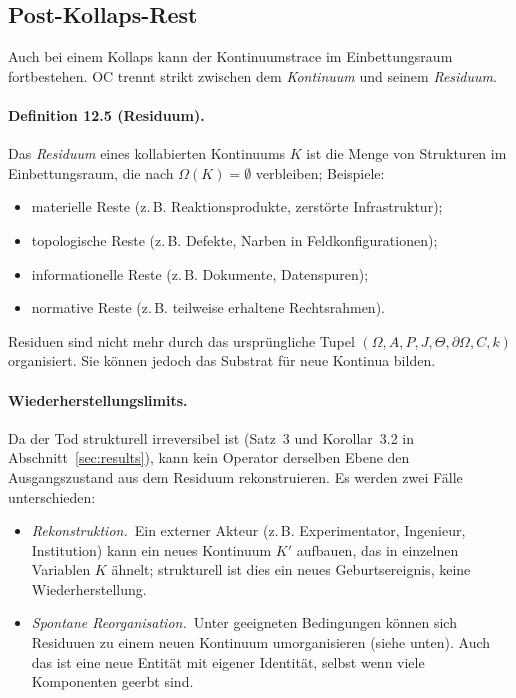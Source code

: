 \subsection{Post-Kollaps-Rest}

Auch bei einem Kollaps kann der Kontinuumstrace im Einbettungsraum fortbestehen.
OC trennt strikt zwischen dem \emph{Kontinuum} und seinem
\emph{Residuum}.

\paragraph{Definition 12.5 (Residuum).}
Das \emph{Residuum} eines kollabierten Kontinuums \(K\) ist die Menge von
Strukturen im Einbettungsraum, die nach \(\Omega(K)=\emptyset\) verbleiben; Beispiele:
\begin{itemize}
  \item materielle Reste (z.\,B. Reaktionsprodukte, zerstörte Infrastruktur);
  \item topologische Reste (z.\,B. Defekte, Narben in Feldkonfigurationen);
  \item informationelle Reste (z.\,B. Dokumente, Datenspuren);
  \item normative Reste (z.\,B. teilweise erhaltene Rechtsrahmen).
\end{itemize}

Residuen sind nicht mehr durch das ursprüngliche Tupel
\((\Omega,A,P,J,\Theta,\partial\Omega,C,k)\) organisiert. Sie können jedoch das
Substrat für neue Kontinua bilden.

\paragraph{Wiederherstellungslimits.}
Da der Tod strukturell irreversibel ist (Satz~3 und Korollar~3.2 in
Abschnitt~\ref{sec:results}), kann kein Operator derselben Ebene den
Ausgangszustand aus dem Residuum rekonstruieren. Es werden zwei Fälle
unterschieden:
\begin{itemize}
  \item \emph{Rekonstruktion.}\
        Ein externer Akteur (z.\,B. Experimentator, Ingenieur, Institution)
        kann ein neues Kontinuum \(K'\) aufbauen, das in einzelnen Variablen
        \(K\) ähnelt; strukturell ist dies ein neues Geburtsereignis, keine
        Wiederherstellung.
  \item \emph{Spontane Reorganisation.}\
        Unter geeigneten Bedingungen können sich Residuuen zu einem neuen
        Kontinuum umorganisieren (siehe unten). Auch das ist eine neue
        Entität mit eigener Identität, selbst wenn viele Komponenten geerbt sind.
\end{itemize}

